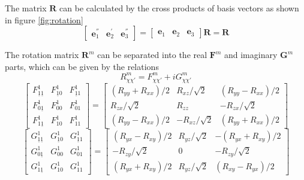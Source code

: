 The matrix $\mathbf{R}$ can be calculated by the cross products of
basis vectors as shown in figure \ref{fig:rotation}
\begin{equation}
\left[\begin{array}{ccc}
\mathbf{e}_{1}^{''} & \mathbf{e}_{2}^{'} & \mathbf{e}_{3}^{''}\end{array}\right]=\left[\begin{array}{ccc}
\mathbf{e}_{1} & \mathbf{e}_{2} & \mathbf{e}_{3}\end{array}\right]\mathbf{R}=\mathbf{R}
\end{equation}

The rotation matrix $\mathbf{R}^{m}$ can be separated into the real
$\mathbf{F}^{m}$ and imaginary $\mathbf{G}^{m}$ parts, which can
be given by the relations
\begin{equation}
R_{\chi\chi'}^{m}=F_{\chi\chi'}^{m}+iG_{\chi\chi'}^{m}
\end{equation}
\begin{equation}
\left[\begin{array}{ccc}
F_{\underline{1}\underline{1}}^{1} & F_{\underline{1}0}^{1} & F_{\underline{1}1}^{1}\\
F_{0\underline{1}}^{1} & F_{00}^{1} & F_{01}^{1}\\
F_{1\underline{1}}^{1} & F_{10}^{1} & F_{11}^{1}
\end{array}\right]=\left[\begin{array}{ccc}
\left(R_{yy}+R_{xx}\right)/2 & R_{xz}/\sqrt{2} & \left(R_{yy}-R_{xx}\right)/2\\
R_{zx}/\sqrt{2} & R_{zz} & -R_{zx}/\sqrt{2}\\
\left(R_{yy}-R_{xx}\right)/2 & -R_{xz}/\sqrt{2} & \left(R_{yy}+R_{xx}\right)/2
\end{array}\right]
\end{equation}
\begin{equation}
\left[\begin{array}{ccc}
G_{\underline{1}\underline{1}}^{1} & G_{\underline{1}0}^{1} & G_{\underline{1}1}^{1}\\
G_{0\underline{1}}^{1} & G_{00}^{1} & G_{01}^{1}\\
G_{1\underline{1}}^{1} & G_{10}^{1} & G_{11}^{1}
\end{array}\right]=\left[\begin{array}{ccc}
\left(R_{yx}-R_{xy}\right)/2 & R_{yz}/\sqrt{2} & -\left(R_{yx}+R_{xy}\right)/2\\
-R_{zy}/\sqrt{2} & 0 & -R_{zy}/\sqrt{2}\\
\left(R_{yx}+R_{xy}\right)/2 & R_{yz}/\sqrt{2} & \left(R_{xy}-R_{yx}\right)/2
\end{array}\right]
\end{equation}


